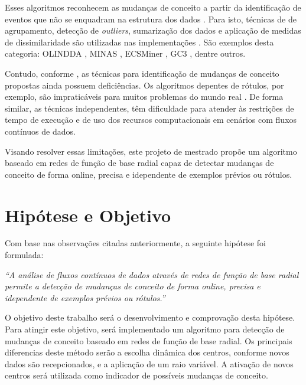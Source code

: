 \documentclass[qual, classic, a4paper]{ufbathesis}
\begin{document}
Esses algoritmos reconhecem as mudanças de conceito a partir da identificação de eventos que não se enquadram na estrutura dos dados \cite{Spinosa:2007:OCA:1244002.1244107}.
Para isto, técnicas de de agrupamento, detecção de \textit{outliers}, sumarização dos dados e aplicação de medidas de dissimilaridade são utilizadas nas implementações \cite{Ryu:Kantardzic:2012}.
São exemplos desta categoria:
OLINDDA \cite{Spinosa:2007:OCA:1244002.1244107},
MINAS \cite{Faria:2013:NDA:2480362.2480515},
ECSMiner \cite{Masud:2011:CNC:1978259.1978529},
GC3 \cite{Sethi2016b:GC3}, dentre outros.

Contudo, conforme \cite{Aggarwal:2006:DSM:1196418}, as técnicas para identificação de mudanças de conceito propostas ainda possuem deficiências.
Os algoritmos depentes de rótulos, por exemplo, são impraticáveis para muitos problemas do mundo real \cite{Gama:2014:SCD:2597757.2523813}.
De forma similar, as técnicas independentes, têm dificuldade para atender às restrições de tempo de execução e de uso dos recursos computacionais em cenários com fluxos contínuos de dados.

Visando resolver essas limitações, este projeto de mestrado propõe um algoritmo baseado em redes de função de base radial capaz de detectar mudanças de conceito de forma online, precisa e idependente de exemplos prévios ou rótulos.

\section{Hipótese e Objetivo}

Com base nas observações citadas anteriormente, a seguinte hipótese foi formulada:

\begin{center}
\textit{``A análise de fluxos contínuos de dados através de redes de função de base radial permite a detecção de mudanças de conceito de forma online, precisa e idependente de exemplos prévios ou rótulos.''}
\end{center}

O objetivo deste trabalho será o desenvolvimento e comprovação desta hipótese.
Para atingir este objetivo, será implementado um algoritmo para detecção de mudanças de conceito baseado em redes de função de base radial. 
Os principais diferencias deste método serão a escolha dinâmica dos centros, conforme novos dados são recepcionados, e a aplicação de um raio variável.
A ativação de novos centros será utilizada como indicador de possíveis mudanças de conceito.
\end{document}

